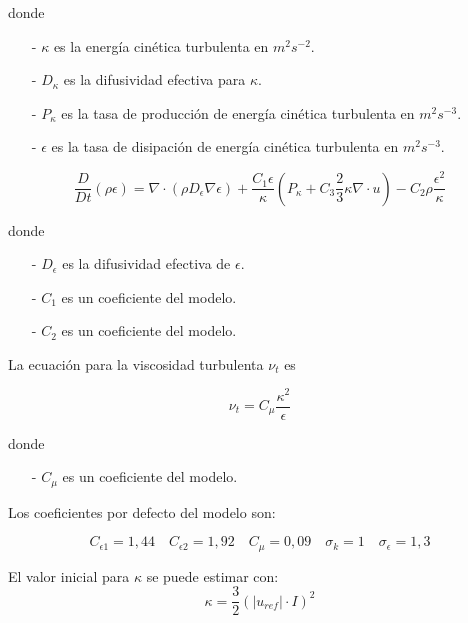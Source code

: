donde

\begin{itemize}
  \item[-] $\kappa$ es la energía cinética turbulenta en $m^{2}s^{-2}$.
  \item[-] $D_{\kappa}$ es la difusividad efectiva para $\kappa$.
  \item[-] $P_{\kappa}$ es la tasa de producción de energía cinética turbulenta en $m^{2}s^{-3}$.
  \item[-] $\epsilon$ es la tasa de disipación de energía cinética turbulenta en $m^{2}s^{-3}$.
\end{itemize}


\begin{equation}\label{eq:k}
  \frac{D}{Dt}(\rho \epsilon) =
  \nabla \cdot (\rho D_{\epsilon}\nabla \epsilon) +
  \frac{C_{1}\epsilon}{\kappa} \left( P_{\kappa}+C_{3}\frac{2}{3}\kappa\nabla\cdot u \right) -
  C_{2}\rho\frac{\epsilon^{2}}{\kappa}
\end{equation}

donde
\begin{itemize}
  \item[-] $D_{\epsilon}$ es la difusividad efectiva de $\epsilon$.
  \item[-] $C_{1}$ es un coeficiente del modelo.
  \item[-] $C_{2}$ es un coeficiente del modelo.
\end{itemize}

La ecuación para la viscosidad turbulenta $\nu_{t}$ es

\begin{equation}\label{eq:nu_t}
  \nu_{t} = C_{\mu}\frac{\kappa^{2}}{\epsilon}
\end{equation}


donde
\begin{itemize}
        \item[-] $C_{\mu}$ es un coeficiente del modelo.
\end{itemize}

Los coeficientes por defecto del modelo son:

\begin{equation}
  C_{\epsilon 1}=1,44
  \quad
  C_{\epsilon 2}=1,92
  \quad
  C_{\mu}=0,09
  \quad
  \sigma_{k}=1
  \quad
  \sigma_{\epsilon}=1,3
\end{equation}

El valor inicial para $\kappa$ se puede estimar con:
\begin{equation}\label{eq:kappa_est}
  \kappa = \frac{3}{2} {\left( |u_{ref}| \cdot I \right)}^{2}
\end{equation}


